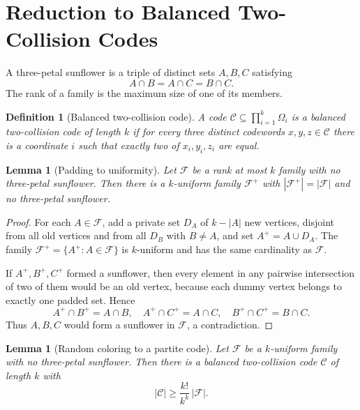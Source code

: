 \documentclass[11pt]{article}
\newtheorem{lemma}[theorem]{Lemma}
\newtheorem{definition}[theorem]{Definition}
\newcommand{\C}{\mathcal C}
\newcommand{\F}{\mathcal F}
\begin{document}
\section{Reduction to Balanced Two-Collision Codes}
\label{sec:front-reduction}

A three-petal sunflower is a triple of distinct sets
$A,B,C$ satisfying
\[
  A\cap B=A\cap C=B\cap C .
\]
The rank of a family is the maximum size of one of its members.

\begin{definition}[Balanced two-collision code]
\label{def:balanced-code}
A code $\C\subseteq\prod_{i=1}^k\Omega_i$ is a balanced two-collision code of
length $k$ if for every three distinct codewords $x,y,z\in\C$ there is a
coordinate $i$ such that exactly two of $x_i,y_i,z_i$ are equal.
\end{definition}

\begin{lemma}[Padding to uniformity]
\label{lem:padding-uniformity}
Let $\F$ be a rank at most $k$ family with no three-petal sunflower.  Then
there is a $k$-uniform family $\F^+$ with $|\F^+|=|\F|$ and no three-petal
sunflower.
\end{lemma}

\begin{proof}
For each $A\in\F$, add a private set $D_A$ of $k-|A|$ new vertices, disjoint
from all old vertices and from all $D_B$ with $B\ne A$, and set
$A^+=A\cup D_A$.  The family
$\F^+=\{A^+:A\in\F\}$ is $k$-uniform and has the same cardinality as $\F$.

If $A^+,B^+,C^+$ formed a sunflower, then every element in any pairwise
intersection of two of them would be an old vertex, because each dummy vertex
belongs to exactly one padded set.  Hence
\[
  A^+\cap B^+=A\cap B,\quad
  A^+\cap C^+=A\cap C,\quad
  B^+\cap C^+=B\cap C .
\]
Thus $A,B,C$ would form a sunflower in $\F$, a contradiction.
\end{proof}

\begin{lemma}[Random coloring to a partite code]
\label{lem:random-coloring-code}
Let $\F$ be a $k$-uniform family with no three-petal sunflower.  Then there
is a balanced two-collision code $\C$ of length $k$ with
\[
  |\C|\ge \frac{k!}{k^k}\,|\F| .
\]
\end{lemma}
\end{document}
